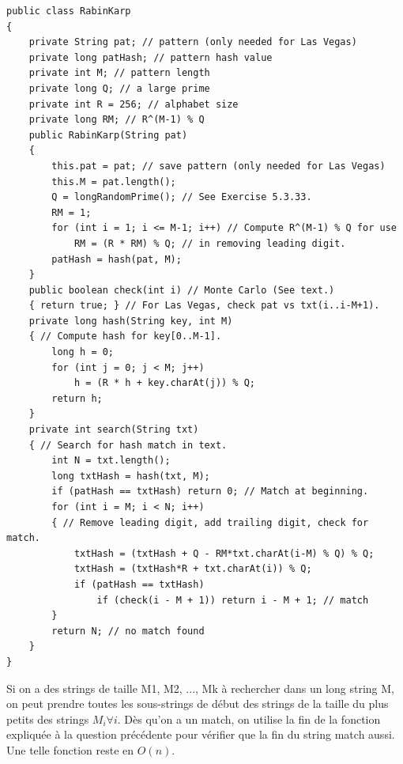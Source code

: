 \documentclass[11pt]{article}
\begin{document}
\begin{enumerate}
\begin{lstlisting}
public class RabinKarp
{
	private String pat; // pattern (only needed for Las Vegas)
	private long patHash; // pattern hash value
	private int M; // pattern length
	private long Q; // a large prime
	private int R = 256; // alphabet size
	private long RM; // R^(M-1) % Q
	public RabinKarp(String pat)
	{
		this.pat = pat; // save pattern (only needed for Las Vegas)
		this.M = pat.length();
		Q = longRandomPrime(); // See Exercise 5.3.33.
		RM = 1;
		for (int i = 1; i <= M-1; i++) // Compute R^(M-1) % Q for use
			RM = (R * RM) % Q; // in removing leading digit.
		patHash = hash(pat, M);
	}
	public boolean check(int i) // Monte Carlo (See text.)
	{ return true; } // For Las Vegas, check pat vs txt(i..i-M+1).
	private long hash(String key, int M)
	{ // Compute hash for key[0..M-1].
		long h = 0;
		for (int j = 0; j < M; j++)
			h = (R * h + key.charAt(j)) % Q;
		return h;
	}
	private int search(String txt)
	{ // Search for hash match in text.
		int N = txt.length();
		long txtHash = hash(txt, M);
		if (patHash == txtHash) return 0; // Match at beginning.
		for (int i = M; i < N; i++)
		{ // Remove leading digit, add trailing digit, check for match.
			txtHash = (txtHash + Q - RM*txt.charAt(i-M) % Q) % Q;
			txtHash = (txtHash*R + txt.charAt(i)) % Q;
			if (patHash == txtHash)
				if (check(i - M + 1)) return i - M + 1; // match
		}
		return N; // no match found
	}
}

\end{lstlisting}

Si on a des strings de taille M1, M2, ..., Mk à rechercher dans un long string M,
on peut prendre toutes les sous-strings de début des strings de la taille du plus 
petits des strings $ M_{i} \forall i $.
Dès qu'on a un match, on utilise la fin de la fonction expliquée à la question précédente
pour vérifier que la fin du string match aussi. Une telle fonction reste en $ O(n) $.


\end{enumerate}
\end{document}
